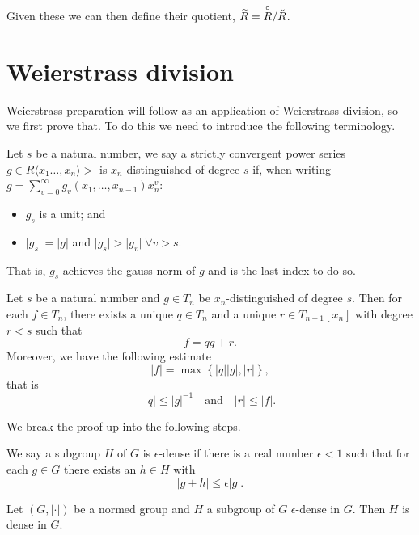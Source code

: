 Given these we can then define their quotient, $\widetilde{R} = \overset{\circ}{R} / \check{R}$.

\section{Weierstrass division}

Weierstrass preparation will follow as an application of Weierstrass division, so we first prove that.
To do this we need to introduce the following terminology.


\begin{definition}
  Let $s$ be a natural number, we say a strictly convergent power series
  $g \in R \langle x_1 \dots, x_n \rangle >$ is $x_n$-distinguished
  of degree $s$ if, when writing $g = \sum_{v = 0}^\infty g_v(x_1, \dots, x_{n-1}) x_n^v$:
  \begin{itemize}
    \item $g_s$ is a unit; and
    \item $ \lvert g_s \rvert = \lvert g \rvert$ and $\lvert g_s \rvert > \lvert g_v \rvert \; \forall
      v > s$.
  \end{itemize}
\end{definition}

That is, $g_s$ achieves the gauss norm of $g$ and is the last index to do so.

\begin{theorem}
  Let $s$ be a natural number and $g \in T_n$ be $x_n$-distinguished of degree $s$. Then for each
  $f \in T_n$, there exists a unique $ q \in T_n$ and a unique $r \in T_{n-1}[x_n]$ with degree
  $r < s$ such that
  \[
    f = q g + r.
  \]
  Moreover, we have the following estimate
  \[
    \lvert f \rvert = \max \left\{ \lvert q \rvert \lvert g \rvert, \lvert r \rvert \right\},
  \]
  that is
  \[
    \lvert q \rvert \leq \lvert g \rvert^{-1} \quad \text{and} \quad \lvert r \rvert \leq \lvert f \rvert.
  \]
\end{theorem}

We break the proof up into the following steps.

\begin{definition}
  We say a subgroup $H$ of $G$ is $\epsilon$-dense if there is a real number $\epsilon < 1$ such that
  for each $g \in G$ there exists an $h \in H$ with
  \[
    \lvert g + h \rvert \leq \epsilon \lvert g \rvert.
  \]
\end{definition}

\begin{lemma}
  Let $(G, \lvert \cdot \rvert)$ be a normed group and $H$ a subgroup of $G$ $\epsilon$-dense in $G$.
  Then $H$ is dense in $G$.
\end{lemma}

